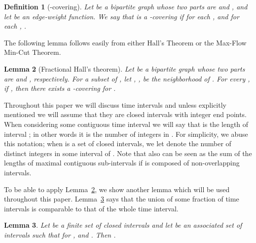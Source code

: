 \documentclass[11pt]{article}
\newtheorem{lemma}{Lemma}[section]
\newtheorem{definition}[lemma]{Definition}
\begin{document}
\begin{titlepage}
\begin{definition} [-covering]
  \label{def:covering} Let  be a bipartite graph
  whose two parts are  and , and let  be an edge-weight function.  We say that  is a
  -covering if for each ,  and for each , .
\end{definition}


The following lemma follows easily from either Hall's Theorem or the Max-Flow Min-Cut Theorem.
\vspace{-1mm}
\begin{lemma}[Fractional Hall's theorem]
 \label{lem:Hall_thm}
 Let  be a bipartite graph whose two parts are
  and , respectively. For a subset  of , let , , be the neighborhood of . For
 every , if , then there
 exists a -covering for .
\end{lemma}

Throughout this paper we will discuss time intervals and unless explicitly mentioned we will assume that they are
closed intervals with integer end points. When considering some contiguous time interval  we will say that
 is the length of interval ; in other words it is the number of integers in . For simplicity, we abuse
this notation; when  is a set of closed intervals, we let  denote the number of distinct integers in some
interval of . Note that  also can be seen as the sum of the lengths of maximal contiguous sub-intervals if 
is composed of non-overlapping intervals.

\iffalse
 If  is not contiguous, then let  be sum of the lengths of the maximal contiguous sub-intervals of .
\fi


To be able to apply Lemma~\ref{lem:Hall_thm}, we show another lemma which will be used throughout
this paper. Lemma~\ref{lem:intervals} says that the union of some fraction of time intervals is comparable to that of the whole
time interval.


\begin{lemma}
\label{lem:intervals} Let  be a finite set of closed intervals and let  be an associated set of intervals such that for ,  and . Then .
\end{lemma}


\iffalse
\begin{lemma}
\label{lem:intervals}
    Let  be a finite set of intervals and .
    Then for , 
\end{lemma}
\begin{proof}
  For , let  and . We first prove that when
   forms a continuous interval, . Note that  is
  also a continuous interval. For simplicity, let  and . Let
   and  denote interval  and 's
  beginning and finishing times, respectively, i.e.  and . By definition, it must be the
  case that (1) . Let  be an
  interval such that . Then we know that . Thus, (2) . By combining (1) and (2), we get the
  desired result. If  is not one continuous interval, let
   be
  the set of maximal continuous intervals in . We can
  show that .
\end{proof}
\fi \vspace{-6mm}


\end{titlepage}
\end{document}

